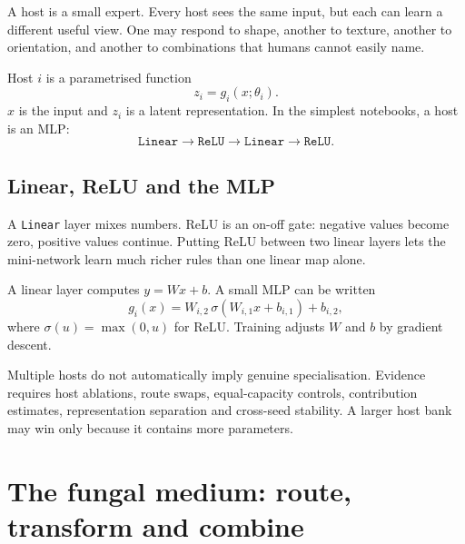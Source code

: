\documentclass[11pt,a4paper]{article}
\begin{document}
\begin{twelvebox}
A host is a small expert. Every host sees the same input, but each can learn a different useful view. One may respond to shape, another to texture, another to orientation, and another to combinations that humans cannot easily name.
\end{twelvebox}

\begin{engineerbox}
Host $i$ is a parametrised function
\[
z_i=g_i(x;\theta_i).
\]
$x$ is the input and $z_i$ is a latent representation. In the simplest notebooks, a host is an MLP:
\[
\texttt{Linear}\rightarrow\texttt{ReLU}\rightarrow\texttt{Linear}\rightarrow\texttt{ReLU}.
\]
\end{engineerbox}

\subsection{Linear, ReLU and the MLP}

\begin{twelvebox}
A \texttt{Linear} layer mixes numbers. ReLU is an on-off gate: negative values become zero, positive values continue. Putting ReLU between two linear layers lets the mini-network learn much richer rules than one linear map alone.
\end{twelvebox}

\begin{engineerbox}
A linear layer computes $y=Wx+b$. A small MLP can be written
\[
g_i(x)=W_{i,2}\,\sigma(W_{i,1}x+b_{i,1})+b_{i,2},
\]
where $\sigma(u)=\max(0,u)$ for ReLU. Training adjusts $W$ and $b$ by gradient descent.
\end{engineerbox}

\begin{researchbox}
Multiple hosts do not automatically imply genuine specialisation. Evidence requires host ablations, route swaps, equal-capacity controls, contribution estimates, representation separation and cross-seed stability. A larger host bank may win only because it contains more parameters.
\end{researchbox}

\newpage
\section{The fungal medium: route, transform and combine}
\end{document}

